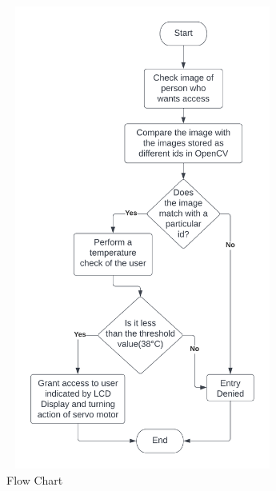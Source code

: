 \documentclass[conference]{IEEEtran}
\begin{document}
	\begin{figure}
		\centering
		\includegraphics[width=9cm, height=15.3cm]{Flow chart.png}
		\caption{\label{fig:caption}Flow Chart}
	\end{figure}
\end{document}
